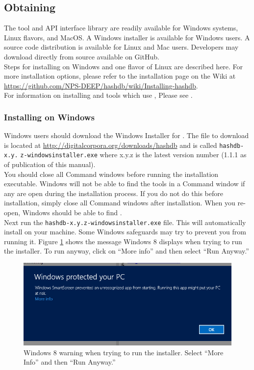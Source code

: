 \documentclass[11pt,fleqn]{article} %
\begin{document}
\subsection{Obtaining \hdb}
The \hdb tool and API interface library are readily available for Windows systems, Linux flavors, and MacOS.  A Windows installer is available for Windows users.  A source code distribution is available for Linux and Mac users.  Developers may download \hdb directly from source available on GitHub.\\

Steps for installing \hdb on Windows and one flavor of Linux are described here. For more installation options, please refer to the installation page on the \hdb Wiki at \url{https://github.com/NPS-DEEP/hashdb/wiki/Installing-hashdb}.\\

For information on installing \sscope and \bulk tools which use \hdb, Please see \textbf{}.\\

\subsubsection{Installing on Windows}
\label{InstallingOnWindows}
Windows users should download the Windows Installer for \hdb. The file to download is located at \url{http://digitalcorpora.org/downloads/hashdb} and is called \texttt{hashdb-x.y.} \texttt{z-windowsinstaller.exe} where x.y.z is the latest version number (1.1.1 as of publication of this manual).\\

You should close all Command windows before running the installation executable. Windows will not be able to find the \hdb tools in a Command window if any are open during the installation process. If you do not do this before installation, simply close all Command windows after installation. When you re-open, Windows should be able to find \hdb.\\

 Next run the \texttt{hashdb-x.y.z-windowsinstaller.exe} file. This will automatically install \hdb on your machine. Some Windows safeguards may try to prevent you from running it. Figure \ref{fig:windowsWarning} shows the message Windows 8 displays when trying to run the installer. To run anyway, click on ``More info'' and then select ``Run Anyway.'' \\
\begin{figure}
	\center
	\includegraphics[scale=.5]{windowsWarning.png}
	\caption{Windows 8 warning when trying to run the installer. Select ``More Info'' and then ``Run Anyway.''}
	\label{fig:windowsWarning}
\end{figure}
\end{document}
